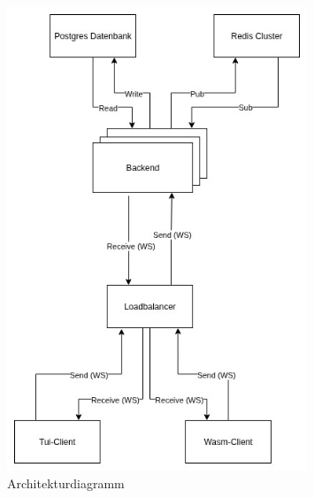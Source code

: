 \begin{figure}[H]
    \centering
    \includegraphics[width=0.8\textwidth]{images/architecture.png}
    \caption{Architekturdiagramm}
    \label{fig:architecture}
\end{figure}
